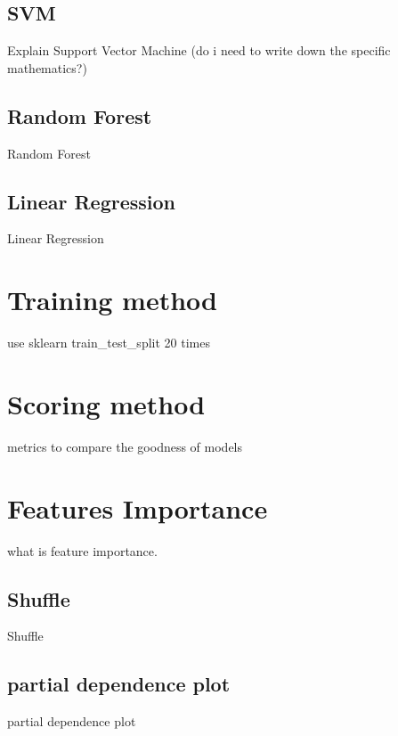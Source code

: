 \subsection{SVM}
Explain Support Vector Machine (do i need to write down the specific mathematics?)

\subsection{Random Forest}
Random Forest

\subsection{Linear Regression}
Linear Regression

\section{Training method}\label{training}
use sklearn train\_test\_split 20 times

\section{Scoring method}\label{scoring}
metrics to compare the goodness of models

\section{Features Importance}\label{featuresimp}
what is feature importance.

\subsection{Shuffle}
Shuffle

\subsection{partial dependence plot}
partial dependence plot 

